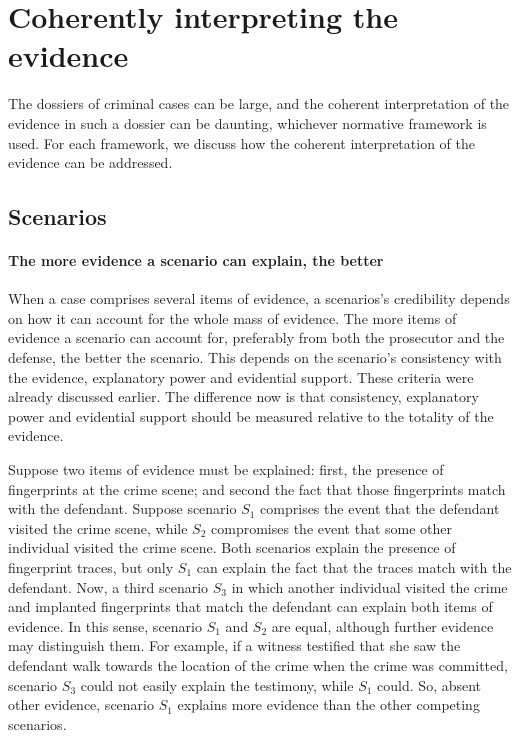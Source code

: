 \documentclass[10pt]{article}
\begin{document}
\section{Coherently interpreting the evidence}
\label{sec:cohint}

The dossiers of criminal cases can be large, and the coherent interpretation of the evidence in such a dossier can 
be daunting, whichever normative framework is used. For each framework, we discuss how the coherent 
interpretation of the evidence can be addressed.

\subsection{Scenarios}


\paragraph{The more evidence a scenario can explain, the better}

When a case comprises several items of evidence, 
a scenarios's credibility depends on how it can account for the whole mass of evidence.  
 The more items of evidence a scenario can account for, preferably from both the prosecutor and the defense, 
 the better the scenario. This depends on the scenario's consistency with the evidence, 
 explanatory power and evidential support. These criteria were already discussed earlier. 
 The difference now is that consistency, explanatory power and evidential support should 
 be measured relative to the totality of the evidence.  
 
 Suppose two items of evidence must be explained: first, the presence of fingerprints at the crime scene; 
and second the fact that those fingerprints match with the defendant.  Suppose scenario $S_1$ comprises the event that the 
defendant visited the crime scene, while $S_2$ compromises the event that some other individual visited the crime scene. Both scenarios 
explain the presence of fingerprint traces, but only $S_1$ can explain the fact that the traces match with the defendant. Now, a third scenario $S_3$ in which another individual visited the crime and  implanted fingerprints that match the defendant can explain both items of evidence. In this sense, scenario $S_1$ and $S_2$ are equal, although further evidence may distinguish them. For example, if a witness testified that she saw the defendant walk towards the location of the crime when the crime was committed, scenario $S_3$ could 
not easily explain the testimony, while $S_1$ could. So, absent other evidence, scenario $S_1$ explains more evidence than the other competing scenarios. 
 
\end{document}

